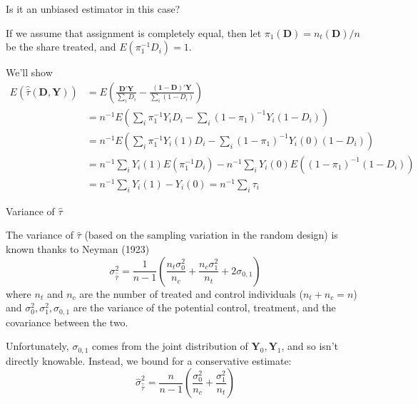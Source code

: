 \documentclass[notes,11pt, aspectratio=169]{beamer}
\newenvironment{wideitemize}{\itemize\addtolength{\itemsep}{10pt}}{\enditemize}
\begin{document}
\begin{frame}
  
  \begin{wideitemize}
  \item Is it an unbiased estimator in this case?
  \item If we assume that assignment is completely equal, then let
    $\pi_{1}(\mathbf{D}) = n_{t}(\mathbf{D})/n$ be the share treated,
    and $E(\pi_{1}^{-1}D_{i}) = 1$.
    \item We'll show 
      \begin{align}
        E(\hat{\bar{\tau}}(\mathbf{D}, \mathbf{Y})) &= E\left(\frac{\mathbf{D}'\mathbf{Y}}{\sum_{i}D_{i}} - \frac{(\mathbf{1}-\mathbf{D})'\mathbf{Y}}{\sum_{i}(1-D_{i})}\right)\\
                                                    &=n^{-1}E\left(\sum_{i}\pi_{1}^{-1}Y_{i}D_{i} - \sum_{i}(1-\pi_{1})^{-1}Y_{i}(1-D_{i})\right)\\
                                                    &=n^{-1}E\left(\sum_{i}\pi_{1}^{-1}Y_{i}(1)D_{i} - \sum_{i}(1-\pi_{1})^{-1}Y_{i}(0)(1-D_{i})\right)\\
                                                    &=n^{-1}\sum_{i}Y_{i}(1)E\left(\pi_{1}^{-1}D_{i}\right) - n^{-1}\sum_{i}Y_{i}(0)E\left((1-\pi_{1})^{-1}(1-D_{i})\right)\\
        &=n^{-1}\sum_{i}Y_{i}(1) - Y_{i}(0) = n^{-1}\sum_{i}\tau_{i}
      \end{align}
    \end{wideitemize}
\end{frame}


\begin{frame}{Variance of $\hat{\tau}$}
  \begin{wideitemize}
  \item The variance of $\hat{\tau}$ (based on the sampling variation
    in the random design) is known thanks to Neyman (1923)
    \begin{equation}
      \sigma^{2}_{\hat{\bar{\tau}}} = \frac{1}{n-1}\left(\frac{n_{t}\sigma^{2}_{0}}{n_{c}} + \frac{n_{c} \sigma^{2}_{1}}{n_{t}} + 2\sigma_{0,1}\right)
    \end{equation}
    where $n_{t}$ and $n_{c}$ are the number of treated and control
    individuals ($n_{t} + n_{c} = n$) and
    $\sigma^{2}_{0}, \sigma^{2}_{1}, \sigma_{0,1}$ are the variance of
    the potential control, treatment, and the covariance between the
    two.
  \item Unfortunately, $\sigma_{0,1}$ comes from the joint
    distribution of $\mathbf{Y}_{0}, \mathbf{Y}_{1}$, and so isn't
    directly knowable. Instead, we bound for a conservative estimate:
    \begin{equation}
      \hat{\sigma}^{2}_{\hat{\bar{\tau}}} = \frac{n}{n-1}\left(\frac{\sigma^{2}_{0}}{n_{c}} + \frac{\sigma^{2}_{1}}{n_{t}}\right)
    \end{equation}
  \end{wideitemize}
\end{frame}
\end{document}
